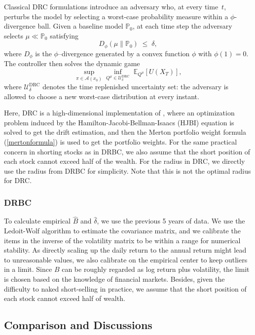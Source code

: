 \documentclass[11pt]{article}
\theoremstyle{definition}
\begin{document}
Classical DRC formulations \cite{HansenSargent2001,hansen2008robustness} introduce an adversary who, at every time~$t$, perturbs the model by selecting a worst-case probability measure within a $\phi$-divergence ball.  
Given a baseline model ${\mathbb{P}_0}$, at each time step the adversary selects ${\mu \ll \mathbb{P}_0}$ satisfying
\[
D_\phi(\mu\|\mathbb{P}_0)\;\le\;\delta ,
\]
where $D_\phi$ is the $\phi$--divergence generated by a convex function $\phi$ with $\phi(1)=0$.  
The controller then solves the dynamic game
\begin{equation}
\sup_{\pi\in\mathcal A(x_0)}
\inf_{{Q}^\mu\in\mathcal U_\delta^{\text{DRC}}}
\;\mathbb{E}_{{ Q^\mu}}\!\left[U(X_T)\right],
\label{eq:drc-primal}
\end{equation}
where $\mathcal U_\delta^{\text{DRC}}$ denotes the time replenished uncertainty set: the adversary is allowed to choose a new worst-case distribution at every instant.  


Here, DRC is a high-dimensional implementation of \cite{Blanchet2025Duality}, where an optimization problem induced by the Hamilton-Jacobi-Bellman-Isaacs (HJBI) equation is solved to get the drift estimation, and then the Merton portfolio weight formula (\ref{mertonformula}) is used to get the portfolio weights. For the same practical concern in shorting stocks as in DRBC, we also assume that the short position of each stock cannot exceed half of the wealth. For the radius in DRC, we directly use the radius from DRBC for simplicity. Note that this is not the optimal radius for DRC. 

\subsubsection{DRBC}
To calculate empirical $\hat{B}$ and $\hat{\delta}$, we use the previous 5 years of data. We use the Ledoit-Wolf \cite{ledoit2004well} algorithm to estimate the covariance matrix, and we calibrate the items in the inverse of the volatility matrix to be within a range for numerical stability. As directly scaling up the daily return to the annual return might lead to unreasonable values, we also calibrate on the empirical center to keep outliers in a limit. Since $B$ can be roughly regarded as log return plus volatility, the limit is chosen based on the knowledge of financial markets. Besides, given the difficulty to naked short-selling in practice, we assume that the short position of each stock cannot exceed half of wealth.  


\subsection{Comparison and Discussions}
\end{document}
